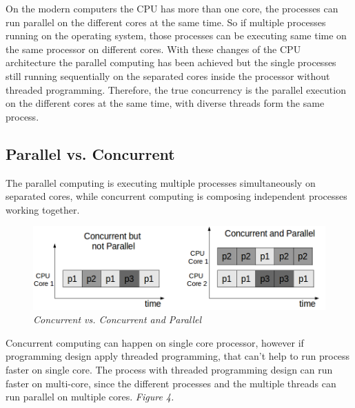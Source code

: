 \documentclass[12pt]{article}
\begin{document}
On the modern computers the CPU has more than one core, the processes can run parallel on the different cores at the same time. So if multiple processes running on the operating system, those processes can be executing same time on the same processor on different cores. With these changes of the CPU architecture the parallel computing has been achieved but the single processes still running sequentially on the separated cores inside the processor without threaded programming. Therefore, the true concurrency is the parallel execution on the different cores at the same time, with diverse threads form the same process.

\subsection{Parallel vs. Concurrent}
The parallel computing is executing multiple processes simultaneously on separated cores, while concurrent computing is composing independent processes working together. 

\begin{figure}[h!]
\centering
\includegraphics[scale=0.3]{Pictures/concurrent_vs_parallel.png}
\caption{\textit{\color{gray}Concurrent vs. Concurrent and Parallel \cite{Nikolay}}}
\end{figure}

Concurrent computing can happen on single core processor, however if programming design apply threaded programming, that can’t help to run process faster on single core. The process with threaded programming design can run faster on multi-core, since the different processes and the multiple threads can run parallel on multiple cores. \textit{\color{gray}Figure 4.}\\
\end{document}
